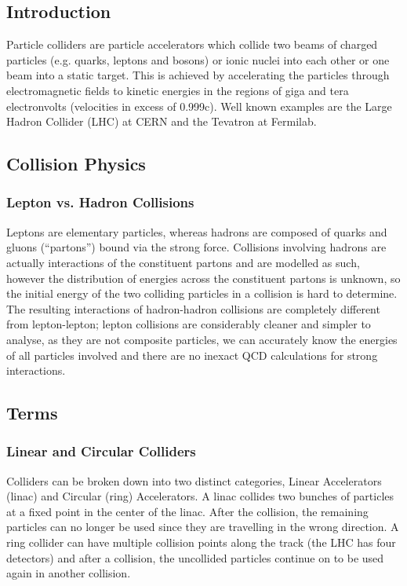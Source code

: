  \subsection{Introduction}
 
 Particle colliders are particle accelerators which collide two beams of charged particles (e.g. quarks, leptons and bosons) or ionic nuclei into each other or one beam into a static target. This is achieved by accelerating the particles through electromagnetic fields to kinetic energies in the regions of giga and tera electronvolts (velocities in excess of 0.999c). Well known examples are the Large Hadron Collider (LHC) at CERN and the Tevatron at Fermilab.
 
 \subsection{Collision Physics}
 
 \subsubsection{Lepton vs. Hadron Collisions}
 
 Leptons are elementary particles, whereas hadrons are composed of quarks and gluons (``partons'') bound via the strong force. Collisions involving hadrons are actually interactions of the constituent partons and are modelled as such, however the distribution of energies across the constituent partons is unknown, so the initial energy of the two colliding particles in a collision is hard to determine. The resulting interactions of hadron-hadron collisions are completely different from lepton-lepton; lepton collisions are considerably cleaner and simpler to analyse, as they are not composite particles, we can accurately know the energies of all particles involved and there are no inexact QCD calculations for strong interactions. \cite{CERN:ColliderPhysics}
 
 \subsection{Terms}
 
 \subsubsection{Linear and Circular Colliders}
 
 Colliders can be broken down into two distinct categories, Linear Accelerators (linac) and Circular (ring) Accelerators.
 A linac collides two bunches of particles at a fixed point in the center of the linac. After the collision, the remaining particles can no longer be used since they are travelling in the wrong direction. A ring collider can have multiple collision points along the track (the LHC has four detectors) and after a collision, the uncollided particles continue on to be used again in another collision.  
 
